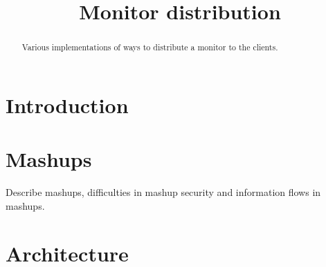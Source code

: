 \documentclass{llncs}
\title{Monitor distribution}
\begin{document}

\maketitle



\begin{abstract}
Various implementations of ways to distribute a monitor to the clients.
\end{abstract}










\section{Introduction}
\label{sec:intro}

\section{Mashups}
\label{sec:mash}

Describe mashups, difficulties in mashup security and information flows in mashups.

\section{Architecture}
\label{sec:arch}
\end{document}
